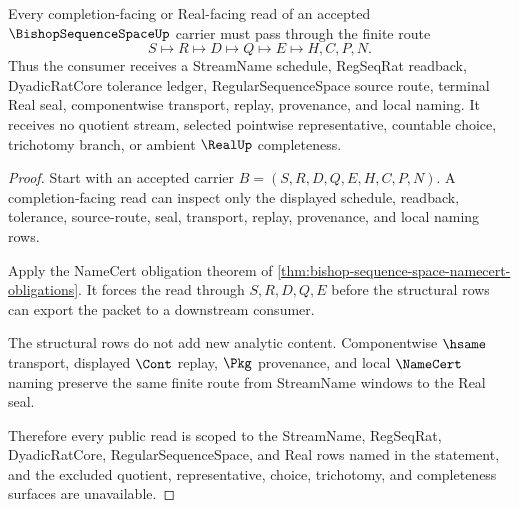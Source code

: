 \begin{theorem}
\label{thm:bishop-sequence-space-stream-regseq-real-scope}
Every completion-facing or Real-facing read of an accepted $\BishopSequenceSpaceUp$ carrier must pass through the finite route
$$
S \longmapsto R \longmapsto D \longmapsto Q \longmapsto E \longmapsto H,C,P,N .
$$
Thus the consumer receives a StreamName schedule, RegSeqRat readback, DyadicRatCore tolerance ledger, RegularSequenceSpace source route, terminal Real seal, componentwise transport, replay, provenance, and local naming. It receives no quotient stream, selected pointwise representative, countable choice, trichotomy branch, or ambient $\RealUp$ completeness.
\end{theorem}
\begin{proof}
Start with an accepted carrier $B=(S,R,D,Q,E,H,C,P,N)$. A completion-facing read can inspect only the displayed schedule, readback, tolerance, source-route, seal, transport, replay, provenance, and local naming rows.

Apply the NameCert obligation theorem of \autoref{thm:bishop-sequence-space-namecert-obligations}. It forces the read through $S,R,D,Q,E$ before the structural rows can export the packet to a downstream consumer.

The structural rows do not add new analytic content. Componentwise $\hsame$ transport, displayed $\Cont$ replay, $\Pkg$ provenance, and local $\NameCert$ naming preserve the same finite route from StreamName windows to the Real seal.

Therefore every public read is scoped to the StreamName, RegSeqRat, DyadicRatCore, RegularSequenceSpace, and Real rows named in the statement, and the excluded quotient, representative, choice, trichotomy, and completeness surfaces are unavailable.
\end{proof}



